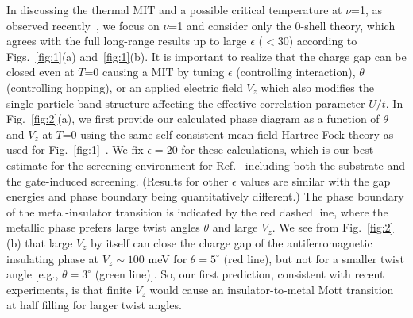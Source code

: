 \documentclass[aps,prb,twocolumn,superscriptaddress,longbibliography]{revtex4-2}
\newcommand{\anno}[1]{}
\begin{document}
In discussing the thermal MIT and a possible critical temperature at $\nu$=1, as observed recently~\cite{ghiotto2021quantum}\anno{ [Columbia Nature 2021]},  we focus on $\nu$=1 and consider only the 0-shell theory, which agrees with the full long-range results up to large $\epsilon$  ($<$30) according to Figs.~\ref{fig:1}(a) and~\ref{fig:1}(b).  It is important to realize that the charge gap can be closed even at $T$=0 causing a MIT by tuning $\epsilon$  (controlling interaction), $\theta$  (controlling hopping), or an applied electric field $V_z$ which also modifies the single-particle band structure affecting the effective correlation parameter $U/t$. In Fig.~\ref{fig:2}(a), we first provide our calculated phase diagram as a function of $\theta$ and $V_z$ at $T$=0 using the same self-consistent mean-field Hartree-Fock theory as used for Fig.~\ref{fig:1}~\cite{pan2020band}.\anno{[cite our PRR]}  We fix $\epsilon=20$ for these calculations, which is our best estimate for the screening environment for Ref.~\anno{[Columbia]} including both the substrate and the gate-induced screening. (Results for other $\epsilon$ values are similar with the gap energies and phase boundary being quantitatively different.)
The phase boundary of the metal-insulator transition is indicated by the red dashed line, where the metallic phase prefers large twist angles $\theta$ and large $V_z$.  We see from Fig.~\ref{fig:2}(b) that large $V_z$ by itself can close the charge gap of the antiferromagnetic insulating phase at $V_z\sim 100$ meV for $\theta =5^\circ$ (red line), but not for a smaller twist angle [e.g., $\theta=3^\circ$ (green line)]. So, our first prediction, consistent with recent experiments, is that finite $V_z$ would cause an insulator-to-metal Mott transition at half filling for larger twist angles.
\end{document}
